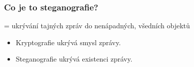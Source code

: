 \documentclass{beamer}
\begin{document}

\begin{frame}
\frametitle{Co je to steganografie?}

= ukrývání tajných zpráv do nenápadných, všedních objektů

\begin{itemize}
\item Kryptografie ukrývá smysl zprávy.
\item Steganografie ukrývá existenci zprávy.
\end{itemize}
\end{frame}

\providecommand{\iconKEY}[1]{\tikz[line width=1.2pt]{%
	\draw [yellow!90!black, -] (0,0) circle (.1);
	\draw [yellow!90!black, -] (-.1,0) -| (-.4,-.1);
	\draw [yellow!90!black, -] (-.1,0) -| (-.5,-.075);
	\draw [yellow!90!black, -] (-.1,0) -| (-.6,-.1);
	\draw (-.35,-.05) node [above, inner sep=2.5pt] {\scriptsize #1};
}}
\end{document}
